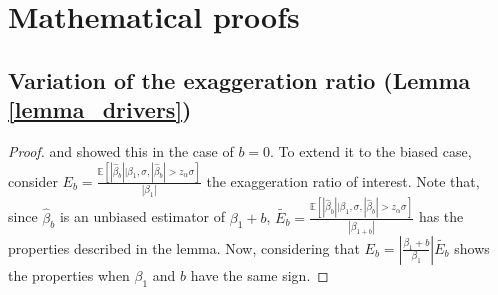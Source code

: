 \documentclass[usletter, 12pt]{article}
\begin{document}


		
	
\newpage

\singlespacing
\setlength\bibsep{5pt}

\begingroup
\renewcommand{\em}{\itshape}
\renewcommand{\emph}{\textit}

\endgroup
\onehalfspacing

\newpage



		

\appendix

	\section{Mathematical proofs}\label{maths_proofs}
	

		\subsection{Variation of the exaggeration ratio (Lemma \ref{lemma_drivers})}
			
			\begin{proof}
				\cite{lu_note_2019} and \cite{zwet_significance_2021} showed this in the case of $b = 0$. 
				To extend it to the biased case, consider 
				$E_{b} = \frac{\mathbb{E}\left[ |\hat{\beta}_{b}| \big| \beta_{1}, \sigma, |\hat{\beta}_{b}| > z_{\alpha} \sigma \right]}{|\beta_{1}|}$ the exaggeration ratio of interest. 
				Note that, since $\hat{\beta}_{b}$ is an unbiased estimator of $\beta_{1} + b$, $\tilde{E_{b}} = \frac{\mathbb{E}\left[ |\hat{\beta}_{b}| \big| \beta_{1}, \sigma, |\hat{\beta}_{b}| > z_{\alpha} \sigma \right]}{|\beta_{1 + b}|}$ has the properties described in the lemma. 
				Now, considering that $E_{b} = \left| \frac{\beta_{1} + b}{\beta_{1}} \right| \tilde{E_{b}}$ shows the properties when $\beta_{1}$ and $b$ have the same sign.
			\end{proof}
	
\end{document}
